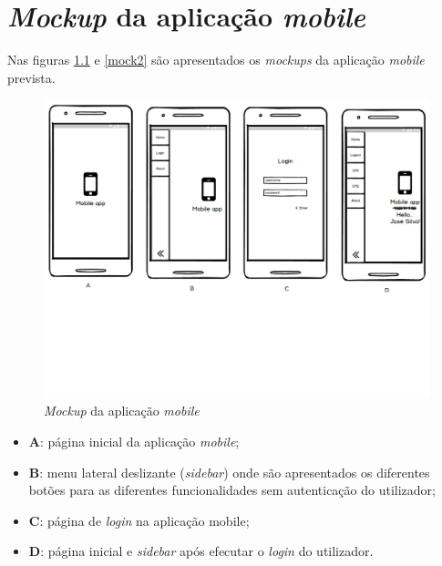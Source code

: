 \chapter{\textit{Mockup} da aplicação \textit{mobile}}
\label{Mockup}

Nas figuras \ref{mock1} e \ref{mock2} são apresentados os \textit{mockups} da aplicação \textit{mobile} prevista. 


\begin{figure}[h]
	\centering
	\includegraphics[width=\linewidth]{esquemas/mockup/1.pdf}
	\caption{\textit{Mockup} da aplicação \textit{mobile}}
	\label{mock1}
\end{figure}

\begin{itemize}
	\item \textbf{A}: página inicial da aplicação \textit{mobile}; 
	\item \textbf{B}: menu lateral deslizante (\textit{sidebar}) onde são apresentados os diferentes botões para as diferentes funcionalidades sem autenticação do utilizador; 
	
	\item \textbf{C}: página de \textit{login} na aplicação mobile; 
	\item \textbf{D}: página inicial e \textit{sidebar} após efecutar o \textit{login} do utilizador. 
\end{itemize}


\newpage


